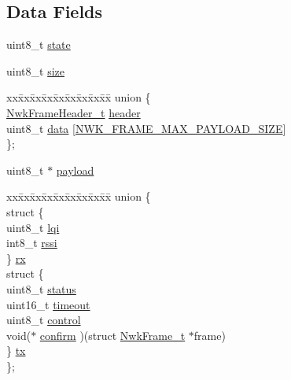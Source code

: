 \subsection*{Data Fields}
\begin{DoxyCompactItemize}
\item 
uint8\-\_\-t \hyperlink{struct_nwk_frame__t_a5fbf3e581463732d26ea7b242c666109}{state}
\item 
uint8\-\_\-t \hyperlink{struct_nwk_frame__t_a42934dd5ff3a529ffb264402944f77e8}{size}
\item 
\begin{tabbing}
xx\=xx\=xx\=xx\=xx\=xx\=xx\=xx\=xx\=\kill
union \{\\
\>\hyperlink{struct_nwk_frame_header__t}{NwkFrameHeader\_t} \hyperlink{struct_nwk_frame__t_ae7615117e566f339c8893bd6f6ed642d}{header}\\
\>uint8\_t \hyperlink{struct_nwk_frame__t_a504e9f54f727b77a64c482fd9c54c30d}{data} \mbox{[}\hyperlink{nwk_frame_8h_aecb889ddcbbc535190f5a83b26aa205b}{NWK\_FRAME\_MAX\_PAYLOAD\_SIZE}\mbox{]}\\
\}; \\

\end{tabbing}\item 
uint8\-\_\-t $\ast$ \hyperlink{struct_nwk_frame__t_abe0e1d3be987a1a6fe8d6b9f19cefa67}{payload}
\item 
\begin{tabbing}
xx\=xx\=xx\=xx\=xx\=xx\=xx\=xx\=xx\=\kill
union \{\\
\>struct \{\\
\>\>uint8\_t \hyperlink{struct_nwk_frame__t_ace554a195e09279c216c3efc6895e66f}{lqi}\\
\>\>int8\_t \hyperlink{struct_nwk_frame__t_ae99f976337170b91bab3c91efee0c19e}{rssi}\\
\>\} \hyperlink{struct_nwk_frame__t_af342a861746a0f6f40285195c4959a9e}{rx}\\
\>struct \{\\
\>\>uint8\_t \hyperlink{struct_nwk_frame__t_ad6257c1abbda87dc2a653a6086f8e9e5}{status}\\
\>\>uint16\_t \hyperlink{struct_nwk_frame__t_a3c49425f94b27976baefc90d1549ffab}{timeout}\\
\>\>uint8\_t \hyperlink{struct_nwk_frame__t_a71639d3ef8b8ced3f027c8cd5b41a780}{control}\\
\>\>void($\ast$ \hyperlink{struct_nwk_frame__t_a7b39f6281e35afdcbb31cbf4f959d639}{confirm} )(struct \hyperlink{struct_nwk_frame__t}{NwkFrame\_t} $\ast$frame)\\
\>\} \hyperlink{struct_nwk_frame__t_ab5e3dc31787a24bb22a62465358d71ba}{tx}\\
\}; \\

\end{tabbing}\end{DoxyCompactItemize}


